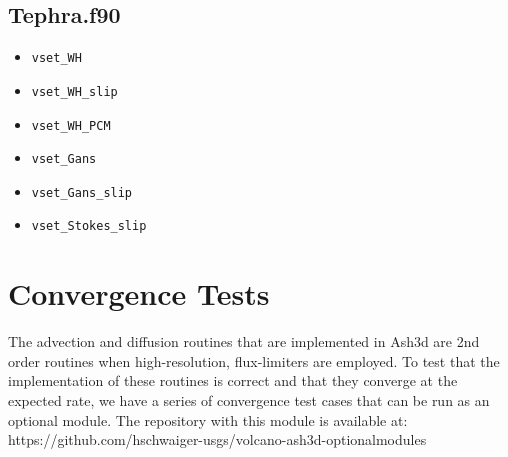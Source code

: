 \subsection{Tephra.f90}
\begin{itemize}
 \item \texttt{vset\_WH}
 \item \texttt{vset\_WH\_slip}
 \item \texttt{vset\_WH\_PCM}
 \item \texttt{vset\_Gans}
 \item \texttt{vset\_Gans\_slip}
 \item \texttt{vset\_Stokes\_slip}
\end{itemize}


%
\clearpage
\section{Convergence Tests}\label{ApxTestSecConv}
The advection and diffusion routines that are implemented in Ash3d
are 2nd order routines when high-resolution, flux-limiters are
employed.
To test that the implementation of these routines is correct and that
they converge at the expected rate, we have a series of convergence
test cases that can be run as an optional module. The repository with
this module is available at:\\
https://github.com/hschwaiger-usgs/volcano-ash3d-optionalmodules

